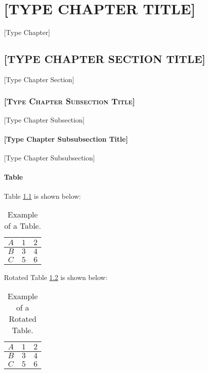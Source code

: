 \chapter{\MakeUppercase{[Type Chapter Title]}}
[Type Chapter]
\section{\MakeUppercase{[Type Chapter Section Title]}}
[Type Chapter Section]
\subsection{\textsc{[Type Chapter Subsection Title]}}
[Type Chapter Subsection]
\subsubsection{[Type Chapter Subsubsection Title]}
[Type Chapter Subsubsection]
\subsubsection{Table}
Table \ref{table:4:1} is shown below:

\begin{table}[!htb]
	\caption{Example of a Table.}
	\label{table:4:1}
	\centering
	\begin{tabular}{|c|c|c|}
		\hline
        $A$ & $1$ & $2$ \\ \hline
		$B$ & $3$ & $4$ \\ \hline
		$C$ & $5$ & $6$ \\ \hline
	\end{tabular}
\end{table}

Rotated Table \ref{table:4:2} is shown below:
\begin{landscape}
\begin{table}[!htb]
	\caption{Example of a Rotated Table.}
	\label{table:4:2}
	\centering
	\begin{tabular}{|c|c|c|}
		\hline
        $A$ & $1$ & $2$ \\ \hline
		$B$ & $3$ & $4$ \\ \hline
		$C$ & $5$ & $6$ \\ \hline
	\end{tabular}
\end{table}
\end{landscape}
